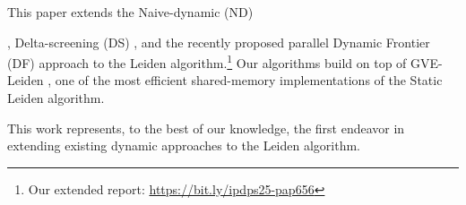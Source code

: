 This paper extends the Naive-dynamic (ND) \cite{com-aynaud10}, Delta-screening (DS) \cite{com-zarayeneh21}, and the recently proposed parallel Dynamic Frontier (DF) approach \cite{sahu2024shared} to the Leiden algorithm.\footnote{Our extended report: \url{https://bit.ly/ipdps25-pap656}} Our algorithms build on top of GVE-Leiden \cite{sahu2024fast}, one of the most efficient shared-memory implementations of the Static Leiden algorithm. This work represents, to the best of our knowledge, the first endeavor in extending existing dynamic approaches to the Leiden algorithm.





